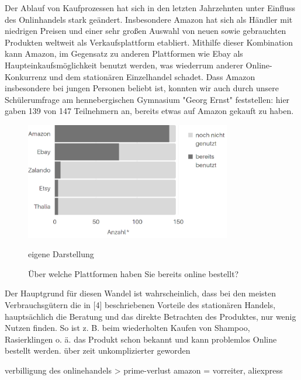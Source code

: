 Der Ablauf von Kaufprozessen hat sich in den letzten Jahrzehnten unter Einfluss des Onlinhandels stark geändert. Insbesondere Amazon hat sich als Händler mit niedrigen Preisen und einer sehr großen Auswahl von neuen sowie gebrauchten Produkten weltweit als Verkaufsplattform etabliert. Mithilfe dieser Kombination kann Amazon, im Gegensatz zu anderen Plattformen wie Ebay als Haupteinkaufsmöglichkeit benutzt werden, was wiederrum anderer Online-Konkurrenz und dem stationären Einzelhandel schadet. Dass Amazon insbesondere bei jungen Personen beliebt ist, konnten wir auch durch unsere Schülerumfrage am hennebergischen Gymnasium "Georg Ernst" feststellen: hier gaben 139 von 147 Teilnehmern an, bereits etwas auf Amazon gekauft zu haben.

\begin{figure}[H]
    \begin{center}
        \includegraphics[width=9cm]{media/schuelerumfrage/2-cut.png} 
        \caption{Über welche Plattformen haben Sie bereits online bestellt?}
        \label{umfrage-plattformen}
        \bildquelle eigene Darstellung
    \end{center}
\end{figure}


Der Hauptgrund für diesen Wandel ist wahrscheinlich, dass bei den meisten Verbrauchsgütern die in [4] beschriebenen Vorteile des stationären Handels, hauptsächlich die Beratung und das direkte Betrachten des Produktes, nur wenig Nutzen finden\cite[S. 2]{Maier}. So ist z. B. beim wiederholten Kaufen von Shampoo, Rasierklingen o. ä. das Produkt schon bekannt und kann problemlos Online bestellt werden. 
\iffalse
    über zeit unkomplizierter geworden
    
    verbilligung des onlinehandels > prime-verlust
    amazon = vorreiter, aliexpress
    
